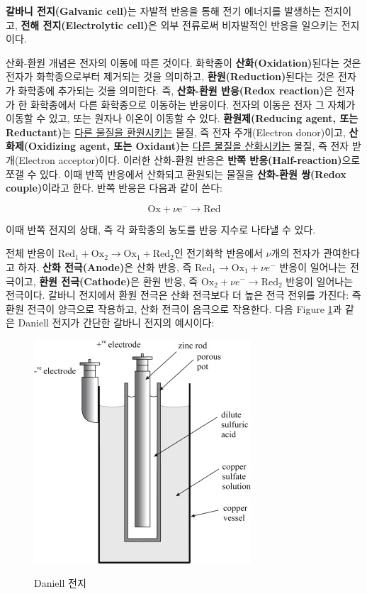         \textbf{갈바니 전지(Galvanic cell)}는 자발적 반응을 통해 전기 에너지를 발생하는 전지이고, \textbf{전해 전지(Electrolytic cell)}은 외부 전류로써 
        비자발적인 반응을 일으키는 전지이다.
        \par 산화-환원 개념은 전자의 이동에 따른 것이다. 화학종이 \textbf{산화(Oxidation)}된다는 것은 전자가 화학종으로부터 제거되는 것을 의미하고, 
        \textbf{환원(Reduction)}된다는 것은 전자가 화학종에 추가되는 것을 의미한다. 즉, \textbf{산화-환원 반응(Redox reaction)}은 전자가 한 화학종에서 다른 
        화학종으로 이동하는 반응이다. 전자의 이동은 전자 그 자체가 이동할 수 있고, 또는 원자나 이온이 이동할 수 있다. \textbf{환원제(Reducing agent, 또는 Reductant)}는 
        \underline{다른 물질을 환원시키는} 물질, 즉 전자 주개(Electron donor)이고, \textbf{산화제(Oxidizing agent, 또는 Oxidant)}는 \underline{다른 물질을 산화시키는} 
        물질, 즉 전자 받개(Electron acceptor)이다. 이러한 산화-환원 반응은 \textbf{반쪽 반응(Half-reaction)}으로 쪼갤 수 있다. 이때 반쪽 반응에서 산화되고 환원되는 
        물질을 \textbf{산화-환원 쌍(Redox couple)}이라고 한다. 반쪽 반응은 다음과 같이 쓴다:
        \begin{defn}[반쪽 반응]
        \begin{equation*}
            \textrm{Ox} + \nu\mathrm{e}^{-}\rightarrow \textrm{Red}
        \end{equation*}
        \end{defn}
        이때 반쪽 전지의 상태, 즉 각 화학종의 농도를 반응 지수로 나타낼 수 있다.
        \par 전체 반응이 $\text{Red}_1 + \text{Ox}_2 \rightarrow \text{Ox}_1 + \text{Red}_2$인 전기화학 반응에서 $\nu$개의 전자가 관여한다고 하자. 
        \textbf{산화 전극(Anode)}은 산화 반응, 즉 $\text{Red}_1 \rightarrow \text{Ox}_1 + \nu e^{-}$ 반응이 일어나는 전극이고, \textbf{환원 전극(Cathode)}은 
        환원 반응, 즉 $\text{Ox}_2 + \nu e^{-} \rightarrow \text{Red}_2$ 반응이 일어나는 전극이다. 갈바니 전지에서 환원 전극은 산화 전극보다 더 높은 전극 전위를 
        가진다: 즉 환원 전극이 양극으로 작용하고, 산화 전극이 음극으로 작용한다. 다음 Figure \ref{f17}과 같은 Daniell 전지가 간단한 갈바니 전지의 예시이다:
        \begin{figure}[H]
            \centering
            \includegraphics[width=0.7\linewidth]{Images/daniell}
            \caption{Daniell 전지}\label{f17}\cite{WINTERBONE2015497}
        \end{figure}

